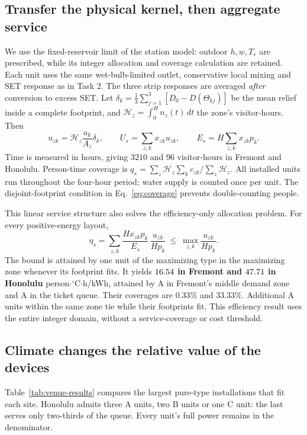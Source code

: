 \subsection{Transfer the physical kernel, then aggregate service}
We use the fixed-reservoir limit of the station model: outdoor $h,w,T_r$ are prescribed, while its integer allocation and coverage calculation are retained. Each unit uses the same wet-bulb-limited outlet, conservative local mixing and SET response as in Task 2. The three strip responses are averaged \emph{after} conversion to excess SET. Let $\delta_k=\frac13\sum_{j=1}^3[D_0-D(\Theta_{kj})]$ be the mean relief inside a complete footprint, and $\mathcal H_z=\int_0^H n_z(t)\,dt$ the zone's visitor-hours. Then
\begin{equation}
 u_{zk}=\mathcal H_z\frac{a_k}{A_z}\delta_k,\qquad
 U_s=\sum_{z,k}x_{zk}u_{zk},\qquad E_s=H\sum_{z,k}x_{zk}p_k.
\label{eq:venue-service}
\end{equation}
Time is measured in hours, giving $3210$ and $96$ visitor-hours in Fremont and Honolulu. Person-time coverage is $q_s=\sum_z\mathcal H_z\sum_k c_{zk}/\sum_z\mathcal H_z$. All installed units run throughout the four-hour period; water supply is counted once per unit. The disjoint-footprint condition in Eq.~\eqref{eq:coverage} prevents double-counting people.

This linear service structure also solves the efficiency-only allocation problem. For every positive-energy layout,
\begin{equation}
 \eta_s=\sum_{z,k}\frac{Hx_{zk}p_k}{E_s}\,
                  \frac{u_{zk}}{Hp_k}
 \ \le\ \max_{z,k}\frac{u_{zk}}{Hp_k}.
\label{eq:venue-bound}
\end{equation}
The bound is attained by one unit of the maximizing type in the maximizing zone whenever its footprint fits. It yields \textbf{$16.54$ in Fremont and $47.71$ in Honolulu} person$\cdot{}^\circ$C$\cdot$h/kWh, attained by A in Fremont's middle demand zone and A in the ticket queue. Their coverages are $0.33\%$ and $33.33\%$. Additional A units within the same zone tie while their footprints fit. This efficiency result uses the entire integer domain, without a service-coverage or cost threshold.

\subsection{Climate changes the relative value of the devices}
Table~\ref{tab:venue-results} compares the largest pure-type installations that fit each site. Honolulu admits three A units, two B units or one C unit: the last serves only two-thirds of the queue. Every unit's full power remains in the denominator.


